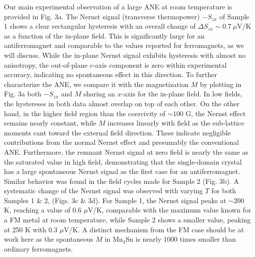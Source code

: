 \documentclass[amsmath,amssymb]{nature}
\begin{document}
Our main experimental observation of a large ANE at room temperature is provided in Fig. 3a. The Nernst signal (transverse thermopower) $-S_{zx}$ of Sample 1 shows a clear rectangular hysteresis with an overall change of $\Delta S_{zx} \sim 0.7 ~\mu$V/K as a function of the in-plane field. This is significantly large for an antiferromagnet and comparable to the values reported for ferromagnets, as we will discuss. While the in-plane Nernst signal exhibits hysteresis with almost no anisotropy, the out-of-plane $c$-axis component is zero within experimental accuracy, indicating no spontaneous effect in this direction. 
To further characterize the ANE, we compare it with the magnetization $M$ by plotting in Fig. 3a both $-S_{zx}$ and $M$ sharing an $x$-axis for the in-plane field. In low fields, the hystereses in both data almost overlap on top of each other. On the other hand, in the higher field region than the coercivity of $\sim 100$ G, the Nernst effect remains nearly constant, while $M$ increases linearly with field as the sub-lattice moments cant toward the external field direction. These indicate negligible contributions from the normal Nernst effect and presumably the conventional ANE. Furthermore, the remnant Nernst signal at zero field is nearly the same as the saturated value in high field, demonstrating that the single-domain crystal has a large spontaneous Nernst signal as the first case for an antiferromagnet. Similar behavior was found in the field cycles made for Sample 2 (Fig. 3b). A systematic change of the Nernst signal was observed with varying $T$ for both Samples 1 \& 2, (Figs. 3c \& 3d). For Sample 1, the Nernst signal peaks at $\sim 200$ K, reaching a value of 0.6 $\mu$V/K, comparable with the maximum value known for a FM metal at room temperature\cite{Hasegawa2015}, while Sample 2 shows a smaller value, peaking at 250 K with 0.3 $\mu$V/K. A distinct mechanism from the FM case should be at work here as the spontaneous $M$ in Mn$_3$Sn is nearly 1000 times smaller than ordinary ferromagnets.
\end{document}
